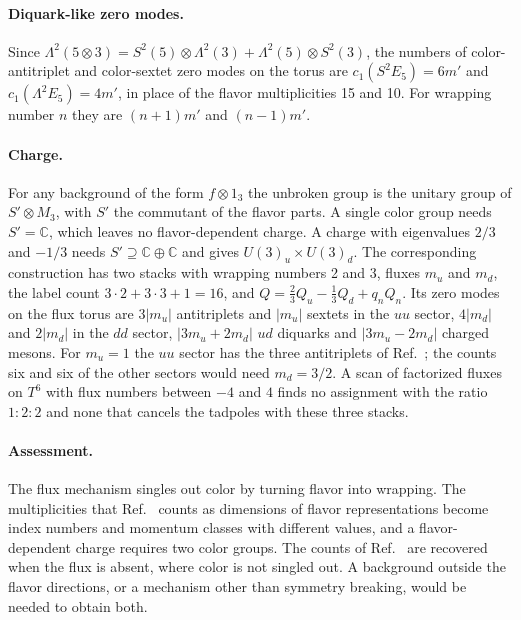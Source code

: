 \paragraph{Diquark-like zero modes.}
Since $\Lambda^2(5\otimes3)=S^2(5)\otimes\Lambda^2(3)+
\Lambda^2(5)\otimes S^2(3)$, the numbers of color-antitriplet and
color-sextet zero modes on the torus are $c_1(S^2E_5)=6m'$ and
$c_1(\Lambda^2E_5)=4m'$, in place of the flavor multiplicities 15 and
10. For wrapping number $n$ they are $(n+1)m'$ and $(n-1)m'$.

\paragraph{Charge.}
For any background of the form $f\otimes1_3$ the unbroken group is the
unitary group of $S'\otimes M_3$, with $S'$ the commutant of the flavor
parts. A single color group needs $S'=\mathbb C$, which leaves no
flavor-dependent charge. A charge with eigenvalues $2/3$ and $-1/3$
needs $S'\supseteq\mathbb C\oplus\mathbb C$ and gives
$U(3)_u\times U(3)_d$. The corresponding construction has two stacks
with wrapping numbers 2 and 3, fluxes $m_u$ and $m_d$, the label count
$3\cdot2+3\cdot3+1=16$, and $Q=\tfrac23Q_u-\tfrac13Q_d+q_nQ_n$. Its
zero modes on the flux torus are $3|m_u|$ antitriplets and $|m_u|$
sextets in the $uu$ sector, $4|m_d|$ and $2|m_d|$ in the $dd$ sector,
$|3m_u+2m_d|$ $ud$ diquarks and $|3m_u-2m_d|$ charged mesons. For
$m_u=1$ the $uu$ sector has the three antitriplets of
Ref.~\cite{Rivero2024}; the counts six and six of the other sectors
would need $m_d=3/2$. A scan of factorized fluxes on $T^6$ with flux
numbers between $-4$ and $4$ finds no assignment with the ratio
$1:2:2$ and none that cancels the tadpoles with these three stacks.

\paragraph{Assessment.}
The flux mechanism singles out color by turning flavor into wrapping.
The multiplicities that Ref.~\cite{Rivero2024} counts as dimensions of
flavor representations become index numbers and momentum classes with
different values, and a flavor-dependent charge requires two color
groups. The counts of Ref.~\cite{Rivero2024} are recovered when the flux
is absent, where color is not singled out. A background outside the
flavor directions, or a mechanism other than symmetry breaking, would
be needed to obtain both.
